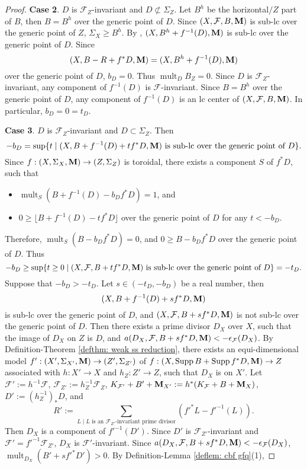 \documentclass[11pt]{amsart}
\numberwithin{equation}{section}
\newcommand{\Mm}{{\bf{M}}}
\newcommand{\Supp}{\operatorname{Supp}}
\newcommand{\mult}{\operatorname{mult}}
\newcommand{\Ff}{\mathcal{F}}
\theoremstyle{definition}
\theoremstyle{definition}
\theoremstyle{definition}
\begin{document}
\begin{proof}
\medskip

\noindent\textbf{Case 2}. $D$ is $\Ff_Z$-invariant and $D\not\subset\Sigma_Z$. Let $B^h$ be the horizontal$/Z$ part of $B$, then $B=B^h$ over the generic point of $D$. Since $(X,\Ff,B,\Mm)$ is sub-lc over the generic point of $Z$, $\Sigma_X\geq B^h$. By \cite[Lemma 6.6]{LLM23}, $(X,B^h+f^{-1}(D),\Mm)$ is sub-lc over the generic point of $D$. Since
$$(X,B-R+f^*D,\Mm)=(X,B^h+f^{-1}(D),\Mm)$$
over the generic point of $D$, $b_D=0$. Thus $\mult_DB_Z=0$. Since $D$ is $\Ff_Z$-invariant, any component of $f^{-1}(D)$ is $\Ff$-invariant. Since $B=B^h$ over the generic point of $D$, any component of $f^{-1}(D)$ is an lc center of $(X,\Ff,B,\Mm)$. In particular,
$b_D=0=t_D.$

\medskip

\noindent\textbf{Case 3}. $D$ is $\Ff_Z$-invariant and $D\subset\Sigma_Z$. Then
$$-b_D=\sup\{t\mid (X,B+f^{-1}(D)+tf^*D,\Mm)\text{ is sub-lc over the generic point of } D\}.$$
Since $f: (X,\Sigma_X,\Mm)\rightarrow (Z,\Sigma_Z)$ is toroidal, there exists a component $S$ of $f^*D$, such that
\begin{itemize}
    \item $\mult_S(B+f^{-1}(D)-b_Df^*D)=1$, and
    \item $0\geq \lfloor B+f^{-1}(D)-tf^*D\rfloor$ over the generic point of $D$ for any $t<-b_D$.
\end{itemize}
Therefore, $\mult_S(B-b_Df^*D)=0$, and $0\geq B-b_Df^*D$ over the generic point of $D$. Thus
$$-b_D\geq \sup\{t\geq 0\mid (X,\Ff,B+tf^*D,\Mm)\text{ is sub-lc over the generic point of } D\}=-t_D.$$
Suppose that $-b_D>-t_D$. Let $s\in (-t_D,-b_D)$ be a real number, then $$(X,B+f^{-1}(D)+sf^*D,\Mm)$$ is sub-lc over the generic point of $D$, and $(X,\Ff,B+sf^*D,\Mm)$ is not sub-lc over the generic point of $D$. Then there exists a prime divisor $D_X$ over $X$, such that the image of $D_X$ on $Z$ is $D$, and $a(D_X,\Ff,B+sf^*D,\Mm)<-\epsilon_{\Ff}(D_X)$. By Definition-Theorem \ref{defthm: weak ss reduction}, there exists an equi-dimensional model $f': (X',\Sigma_{X'},\Mm)\rightarrow (Z',\Sigma_{Z'})$ of $f: (X,\Supp B+\Supp f^*D,\Mm)\rightarrow Z$ associated with $h: X'\rightarrow X$ and $h_Z: Z'\rightarrow Z$, such that $D_X$ is on $X'$. Let $\Ff':=h^{-1}\Ff$, $\Ff_{Z'}:=h_Z^{-1}\Ff_Z$, $K_{\Ff'}+B'+\Mm_{X'}:=h^*(K_{\Ff}+B+\Mm_X)$, $D':=(h_Z^{-1})_*D$, and 
$$R':=\sum_{L\mid L\text{ is an }\Ff_{Z'}\text{-invariant prime divisor}}(f'^*L-f'^{-1}(L)).$$
Then $D_X$ is a component of $f'^{-1}(D')$. Since $D'$ is $\Ff_{Z'}$-invariant and $\Ff'=f'^{-1}\Ff_{Z'}$, $D_{X}$ is $\Ff'$-invariant. Since $a(D_X,\Ff,B+sf^*D,\Mm)<-\epsilon_{\Ff}(D_X)$, $\mult_{D_X}(B'+sf'^*D')>0$. By Definition-Lemma \ref{deflem: cbf gfq}(1),

\end{proof}
\end{document}
